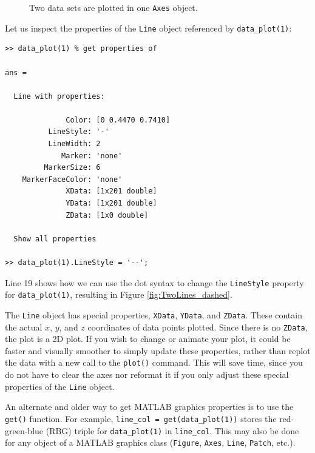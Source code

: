 \begin{figure}[htbp] %
   \centering
   \quad
   \caption{Two data sets are plotted in one \texttt{Axes} object.}
   \label{fig:MultiLinePlot}
\end{figure}

Let us inspect the properties of the \texttt{Line} object referenced by \texttt{data\_plot(1)}:
\begin{lstlisting}[style=Matlab-editor, caption={The properties of \texttt{data\_plot(1)}.}]
>> data_plot(1) % get properties of

ans = 

  Line with properties:

              Color: [0 0.4470 0.7410]
          LineStyle: '-'
          LineWidth: 2
             Marker: 'none'
         MarkerSize: 6
    MarkerFaceColor: 'none'
              XData: [1x201 double]
              YData: [1x201 double]
              ZData: [1x0 double]

  Show all properties

>> data_plot(1).LineStyle = '--';
\end{lstlisting}
Line 19 shows how we can use the dot syntax to change the \texttt{LineStyle} property for \texttt{data\_plot(1)}, resulting in Figure \ref{fig:TwoLines_dashed}.

The \texttt{Line} object has special properties, \texttt{XData}, \texttt{YData}, and \texttt{ZData}. These contain the actual \(x\), \(y\), and \(z\) coordinates of data points plotted. Since there is no \texttt{ZData}, the plot is a 2D plot. If you wish to change or animate your plot, it could be faster and visually smoother to simply update these properties, rather than replot the data with a new call to the \texttt{plot()} command. This will save time, since you do not have to clear the axes nor reformat it if you only adjust these special properties of the \texttt{Line} object.

An alternate and older way to get MATLAB graphics properties is to use the \texttt{get()} function. For example, \texttt{line\_col = get(data\_plot(1))} stores the red-green-blue (RBG) triple for \texttt{data\_plot(1)} in \texttt{line\_col}. This may also be done for any object of a MATLAB graphics class (\texttt{Figure}, \texttt{Axes}, \texttt{Line}, \texttt{Patch}, etc.).

